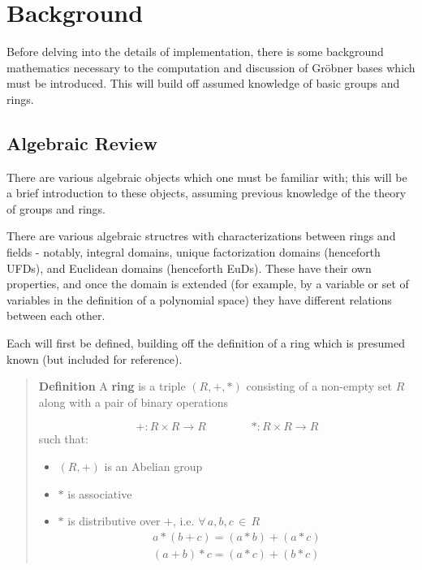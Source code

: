 \documentclass[letterpaper,12pt,titlepage,oneside,final]{book}
\newenvironment{defn}{\begin{quote}%
  \textbf{Definition }%
  \quad
}{%
\end{quote}%
}
\begin{document}
\chapter{Background}\label{chpt:bg}

Before delving into the details of implementation, there is some background mathematics necessary to the computation and discussion of Gr\"obner bases which must be introduced.  This will build off assumed knowledge of basic groups and rings.

\section{Algebraic Review}

There are various algebraic objects which one must be familiar with; this will be a brief introduction to these objects, assuming previous knowledge of the theory of groups and rings.  

There are various algebraic structres with characterizations between rings and fields - notably, integral domains, unique factorization domains (henceforth UFDs), and Euclidean domains (henceforth EuDs).  These have their own properties, and once the domain is extended (for example, by a variable or set of variables in the definition of a polynomial space) they have different relations between each other.  

Each will first be defined, building off the definition of a ring which is presumed known (but included for reference).

\begin{defn}\label{defn: Ring}
  A \textbf{ring} is a triple ${(R, +, *)}$ consisting of a non-empty set ${R}$ along with a pair of binary operations 

  \begin{equation*}
    + : R \times R \rightarrow R   \qquad \qquad * : R \times R \rightarrow R
  \end{equation*}
  such that:

  \begin{itemize}
    \item ${(R, +)}$ is an Abelian group
    \item ${*}$ is associative
    \item ${*}$ is distributive over ${+}$, i.e. ${\forall\, a, b, c\, \in\, R}$\begin{eqnarray*} a*(b+c) = (a*b) + (a*c) \\ (a+b)*c = (a*c) + (b*c) \end{eqnarray*} 
  \end{itemize}
\end{defn}
\end{document}
